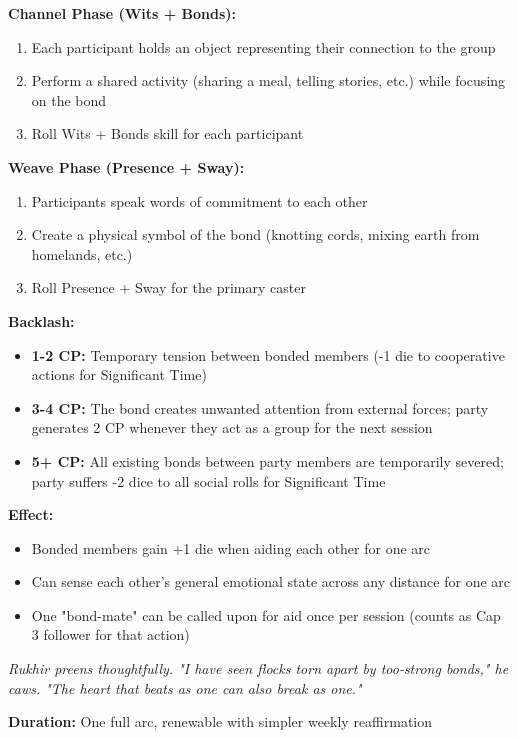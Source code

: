 \documentclass[12pt,twoside]{book}
\newcommand{\shadow}[1]{\textit{#1}}
\begin{document}
\textbf{Channel Phase (Wits + Bonds):}
\begin{enumerate}
\item Each participant holds an object representing their connection to the group
\item Perform a shared activity (sharing a meal, telling stories, etc.) while focusing on the bond
\item Roll Wits + Bonds skill for each participant
\end{enumerate}

\textbf{Weave Phase (Presence + Sway):}
\begin{enumerate}
\item Participants speak words of commitment to each other
\item Create a physical symbol of the bond (knotting cords, mixing earth from homelands, etc.)
\item Roll Presence + Sway for the primary caster
\end{enumerate}

\textbf{Backlash:}
\begin{itemize}
\item \textbf{1-2 CP:} Temporary tension between bonded members (-1 die to cooperative actions for Significant Time)
\item \textbf{3-4 CP:} The bond creates unwanted attention from external forces; party generates 2 CP whenever they act as a group for the next session
\item \textbf{5+ CP:} All existing bonds between party members are temporarily severed; party suffers -2 dice to all social rolls for Significant Time
\end{itemize}

\textbf{Effect:}
\begin{itemize}
\item Bonded members gain +1 die when aiding each other for one arc
\item Can sense each other's general emotional state across any distance for one arc
\item One "bond-mate" can be called upon for aid once per session (counts as Cap 3 follower for that action)
\end{itemize}

\shadow{Rukhir preens thoughtfully. "I have seen flocks torn apart by too-strong bonds," he caws. "The heart that beats as one can also break as one."}

\textbf{Duration:} One full arc, renewable with simpler weekly reaffirmation
\end{document}
